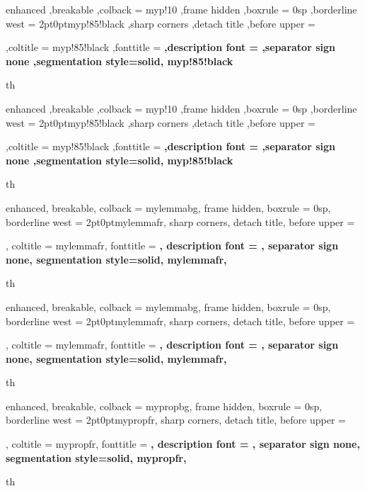 {%
    enhanced
    ,breakable
    ,colback = myp!10
    ,frame hidden
    ,boxrule = 0sp
    ,borderline west = {2pt}{0pt}{myp!85!black}
    ,sharp corners
    ,detach title
    ,before upper = \tcbtitle\par\smallskip
    ,coltitle = myp!85!black
    ,fonttitle = \bfseries\sffamily
    ,description font = \mdseries
    ,separator sign none
    ,segmentation style={solid, myp!85!black}
}
{th}
{%
    enhanced
    ,breakable
    ,colback = myp!10
    ,frame hidden
    ,boxrule = 0sp
    ,borderline west = {2pt}{0pt}{myp!85!black}
    ,sharp corners
    ,detach title
    ,before upper = \tcbtitle\par\smallskip
    ,coltitle = myp!85!black
    ,fonttitle = \bfseries\sffamily
    ,description font = \mdseries
    ,separator sign none
    ,segmentation style={solid, myp!85!black}
}
{th}



{%
    enhanced,
    breakable,
    colback = mylemmabg,
    frame hidden,
    boxrule = 0sp,
    borderline west = {2pt}{0pt}{mylemmafr},
    sharp corners,
    detach title,
    before upper = \tcbtitle\par\smallskip,
    coltitle = mylemmafr,
    fonttitle = \bfseries\sffamily,
    description font = \mdseries,
    separator sign none,
    segmentation style={solid, mylemmafr},
}
{th}

{%
    enhanced,
    breakable,
    colback = mylemmabg,
    frame hidden,
    boxrule = 0sp,
    borderline west = {2pt}{0pt}{mylemmafr},
    sharp corners,
    detach title,
    before upper = \tcbtitle\par\smallskip,
    coltitle = mylemmafr,
    fonttitle = \bfseries\sffamily,
    description font = \mdseries,
    separator sign none,
    segmentation style={solid, mylemmafr},
}
{th}



{%
    enhanced,
    breakable,
    colback = mypropbg,
    frame hidden,
    boxrule = 0sp,
    borderline west = {2pt}{0pt}{mypropfr},
    sharp corners,
    detach title,
    before upper = \tcbtitle\par\smallskip,
    coltitle = mypropfr,
    fonttitle = \bfseries\sffamily,
    description font = \mdseries,
    separator sign none,
    segmentation style={solid, mypropfr},
}
{th}

